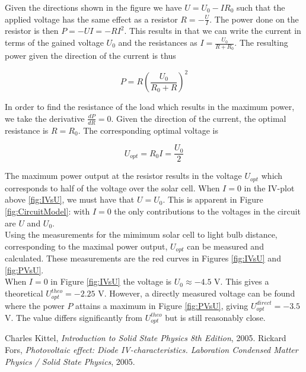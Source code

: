 \documentclass[a4paper,twoside=false,abstract=false,numbers=noenddot,
titlepage=false,headings=small,parskip=half,version=last]{scrartcl}
\begin{document}
Given the directions shown in the figure we have $U=U_0-IR_0$ such that the
applied voltage has the same effect as a resistor $R=-\frac{U}{I}$.
The power done on the resistor is then $P=-U I=-R I^{2}$.
This results in that we can write the current in terms of the gained voltage $U_0$ and the resistances as $I=\frac{U_0}{R + R_0}$.
The resulting power given the direction of the current is thus

\begin{equation}
    P = R (\frac{ U_0}{ R_0+R})^{2}
\end{equation}

In order to find the resistance of the load which results in the maximum power, we take the derivative $\frac{dP}{dR} = 0$.
Given the direction of the current, the optimal resistance is $R = R_0$. The corresponding optimal voltage is

\begin{equation}
    U_{opt}=R_0 I=\frac{U_0}{2}
\end{equation}

The maximum power output at the resistor results in the voltage $ U_{opt}$
which corresponds to half of the voltage over the solar cell.
When $I=0$ in the IV-plot above \ref{fig:IVsU}, we must have that $U = U_0$.
This is apparent in Figure \ref{fig:CircuitModel}: with $I=0$ the only contributions to the voltages in the circuit are $U$ and $U_0$.\\
Using the measurements for the mimimum solar cell to light bulb distance, corresponding to the maximal power output, $U_{opt}$ can be measured and calculated. These measurements are the red curves in Figures \ref{fig:IVsU} and \ref{fig:PVsU}.\\
When $I=0$ in Figure \ref{fig:IVsU} the voltage is $U_0\approx -4.5$ V. This gives a theoretical $U_{opt}^{theo}=-2.25$ V. However, a directly measured voltage can be found where the power $P$ attains a maximum in Figure \ref{fig:PVsU}, giving $U_{opt}^{direct}=-3.5$ V. The value differs significantly from $U_{opt}^{theo}$ but is still reasonably close.

\begin{thebibliography}{1}
        Charles Kittel,
        {\em Introduction to Solid State Physics 8th Edition},
        2005.
		Rickard Fors,
		{\em Photovoltaic effect: Diode IV-characteristics. Laboration Condensed Matter Physics / Solid State Physics},
		2005.
\end{thebibliography}
\end{document}
